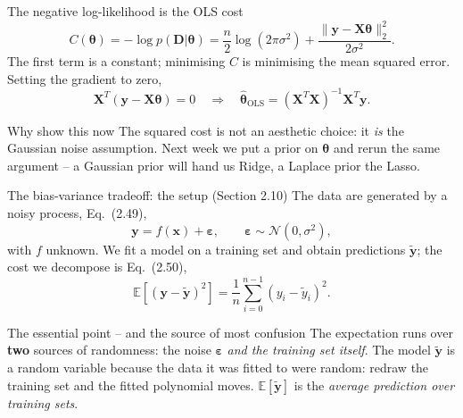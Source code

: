 \documentclass[10pt,aspectratio=169]{beamer}
\begin{document}
\begin{frame}{The negative log-likelihood is the OLS cost}
\[
  C(\bm{\theta})
   = -\log p(\bm{D}\vert\bm{\theta})
   = \frac{n}{2}\log(2\pi\sigma^2)
     + \frac{\|\bm{y}-\bm{X}\bm{\theta}\|_2^2}{2\sigma^2}.
\]
The first term is a constant; minimising $C$ is minimising the mean squared
error.  Setting the gradient to zero,
\[
  \bm{X}^T(\bm{y}-\bm{X}\bm{\theta})=0
  \quad\Longrightarrow\quad
  \hat{\bm{\theta}}_{\mathrm{OLS}}=(\bm{X}^T\bm{X})^{-1}\bm{X}^T\bm{y}.
\]
\vspace{2pt}
\begin{block}{Why show this now}
The squared cost is not an aesthetic choice: it \emph{is} the Gaussian noise
assumption.  Next week we put a prior on $\bm{\theta}$ and rerun the same
argument -- a Gaussian prior will hand us Ridge, a Laplace prior the Lasso.
\end{block}
\end{frame}


\begin{frame}{The bias-variance tradeoff: the setup (Section 2.10)}
The data are generated by a noisy process, Eq.~(2.49),
\[
  \bm{y}=f(\bm{x})+\bm{\varepsilon},
  \qquad
  \bm{\varepsilon}\sim\mathcal{N}(0,\sigma^2),
\]
with $f$ unknown.  We fit a model on a training set and obtain predictions
$\tilde{\bm{y}}$; the cost we decompose is Eq.~(2.50),
\[
  \mathbb{E}\left[(\bm{y}-\tilde{\bm{y}})^2\right]
   = \frac{1}{n}\sum_{i=0}^{n-1}(y_i-\tilde{y}_i)^2 .
\]
\begin{block}{The essential point -- and the source of most confusion}
The expectation runs over \textbf{two} sources of randomness: the noise
$\bm{\varepsilon}$ \emph{and the training set itself}.  The model
$\tilde{\bm{y}}$ is a random variable because the data it was fitted to were
random: redraw the training set and the fitted polynomial moves.
$\mathbb{E}[\tilde{\bm{y}}]$ is the \emph{average prediction over training
sets}.
\end{block}
\end{frame}
\end{document}
